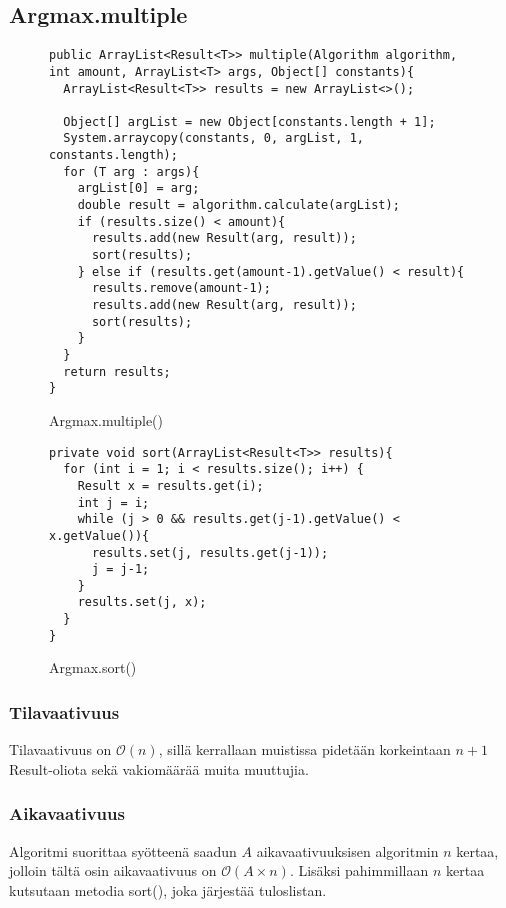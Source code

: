 \documentclass[12pt,a4paper]{article}
\begin{document}
\subsection{Argmax.multiple}

\begin{figure}[H]
\begin{lstlisting}
public ArrayList<Result<T>> multiple(Algorithm algorithm, int amount, ArrayList<T> args, Object[] constants){
  ArrayList<Result<T>> results = new ArrayList<>();
        
  Object[] argList = new Object[constants.length + 1];
  System.arraycopy(constants, 0, argList, 1, constants.length);
  for (T arg : args){
    argList[0] = arg;
    double result = algorithm.calculate(argList);
    if (results.size() < amount){
      results.add(new Result(arg, result));
      sort(results);
    } else if (results.get(amount-1).getValue() < result){
      results.remove(amount-1);
      results.add(new Result(arg, result));
      sort(results);
    }
  }
  return results;
}
\end{lstlisting}
\caption{Argmax.multiple()}
\end{figure}

\begin{figure}[H]
\begin{lstlisting}
private void sort(ArrayList<Result<T>> results){
  for (int i = 1; i < results.size(); i++) {
    Result x = results.get(i);
    int j = i;
    while (j > 0 && results.get(j-1).getValue() < x.getValue()){
      results.set(j, results.get(j-1));
      j = j-1;
    }
    results.set(j, x);
  }
}
\end{lstlisting}
\caption{Argmax.sort()}
\end{figure}

\subsubsection*{Tilavaativuus}
Tilavaativuus on $\mathcal{O}(n)$, sillä kerrallaan muistissa pidetään korkeintaan $n+1$ Result-oliota sekä vakiomäärää muita muuttujia.

\subsubsection*{Aikavaativuus}
Algoritmi suorittaa syötteenä saadun $A$ aikavaativuuksisen algoritmin $n$ kertaa, jolloin tältä osin aikavaativuus on $\mathcal{O}(A \times n)$. Lisäksi pahimmillaan $n$ kertaa kutsutaan metodia sort(), joka järjestää tuloslistan.
\end{document}

